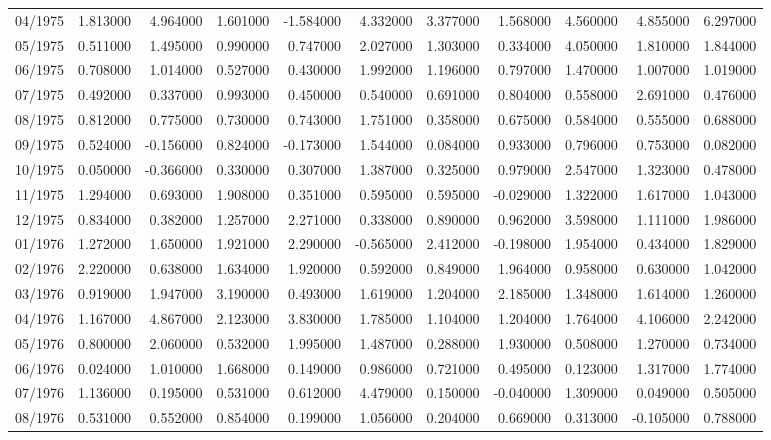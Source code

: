 \begin{tabular}{lrrrrrrrrrr}
04/1975 & 1.813000 & 4.964000 & 1.601000 & -1.584000 & 4.332000 & 3.377000 & 1.568000 & 4.560000 & 4.855000 & 6.297000 \\
05/1975 & 0.511000 & 1.495000 & 0.990000 & 0.747000 & 2.027000 & 1.303000 & 0.334000 & 4.050000 & 1.810000 & 1.844000 \\
06/1975 & 0.708000 & 1.014000 & 0.527000 & 0.430000 & 1.992000 & 1.196000 & 0.797000 & 1.470000 & 1.007000 & 1.019000 \\
07/1975 & 0.492000 & 0.337000 & 0.993000 & 0.450000 & 0.540000 & 0.691000 & 0.804000 & 0.558000 & 2.691000 & 0.476000 \\
08/1975 & 0.812000 & 0.775000 & 0.730000 & 0.743000 & 1.751000 & 0.358000 & 0.675000 & 0.584000 & 0.555000 & 0.688000 \\
09/1975 & 0.524000 & -0.156000 & 0.824000 & -0.173000 & 1.544000 & 0.084000 & 0.933000 & 0.796000 & 0.753000 & 0.082000 \\
10/1975 & 0.050000 & -0.366000 & 0.330000 & 0.307000 & 1.387000 & 0.325000 & 0.979000 & 2.547000 & 1.323000 & 0.478000 \\
11/1975 & 1.294000 & 0.693000 & 1.908000 & 0.351000 & 0.595000 & 0.595000 & -0.029000 & 1.322000 & 1.617000 & 1.043000 \\
12/1975 & 0.834000 & 0.382000 & 1.257000 & 2.271000 & 0.338000 & 0.890000 & 0.962000 & 3.598000 & 1.111000 & 1.986000 \\
01/1976 & 1.272000 & 1.650000 & 1.921000 & 2.290000 & -0.565000 & 2.412000 & -0.198000 & 1.954000 & 0.434000 & 1.829000 \\
02/1976 & 2.220000 & 0.638000 & 1.634000 & 1.920000 & 0.592000 & 0.849000 & 1.964000 & 0.958000 & 0.630000 & 1.042000 \\
03/1976 & 0.919000 & 1.947000 & 3.190000 & 0.493000 & 1.619000 & 1.204000 & 2.185000 & 1.348000 & 1.614000 & 1.260000 \\
04/1976 & 1.167000 & 4.867000 & 2.123000 & 3.830000 & 1.785000 & 1.104000 & 1.204000 & 1.764000 & 4.106000 & 2.242000 \\
05/1976 & 0.800000 & 2.060000 & 0.532000 & 1.995000 & 1.487000 & 0.288000 & 1.930000 & 0.508000 & 1.270000 & 0.734000 \\
06/1976 & 0.024000 & 1.010000 & 1.668000 & 0.149000 & 0.986000 & 0.721000 & 0.495000 & 0.123000 & 1.317000 & 1.774000 \\
07/1976 & 1.136000 & 0.195000 & 0.531000 & 0.612000 & 4.479000 & 0.150000 & -0.040000 & 1.309000 & 0.049000 & 0.505000 \\
08/1976 & 0.531000 & 0.552000 & 0.854000 & 0.199000 & 1.056000 & 0.204000 & 0.669000 & 0.313000 & -0.105000 & 0.788000 \\

\end{tabular}
